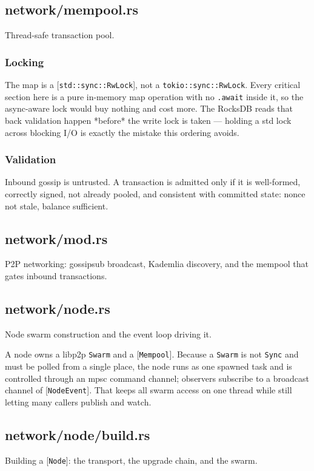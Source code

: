 \documentclass[11pt,a4paper]{article}
\begin{document}
\subsection{network/mempool.rs}
Thread-safe transaction pool.

\subsubsection{Locking}

The map is a [\texttt{std::sync::RwLock}], not a \texttt{tokio::sync::RwLock}. Every
critical section here is a pure in-memory map operation with no \texttt{.await}
inside it, so the async-aware lock would buy nothing and cost more. The
RocksDB reads that back validation happen *before* the write lock is taken —
holding a std lock across blocking I/O is exactly the mistake this ordering
avoids.

\subsubsection{Validation}

Inbound gossip is untrusted. A transaction is admitted only if it is
well-formed, correctly signed, not already pooled, and consistent with
committed state: nonce not stale, balance sufficient.

\subsection{network/mod.rs}
P2P networking: gossipsub broadcast, Kademlia discovery, and the mempool
that gates inbound transactions.

\subsection{network/node.rs}
Node swarm construction and the event loop driving it.

A node owns a libp2p \texttt{Swarm} and a [\texttt{Mempool}]. Because a \texttt{Swarm} is not
\texttt{Sync} and must be polled from a single place, the node runs as one spawned
task and is controlled through an mpsc command channel; observers subscribe
to a broadcast channel of [\texttt{NodeEvent}]. That keeps all swarm access on one
thread while still letting many callers publish and watch.

\subsection{network/node/build.rs}
Building a [\texttt{Node}]: the transport, the upgrade chain, and the swarm.
\end{document}
